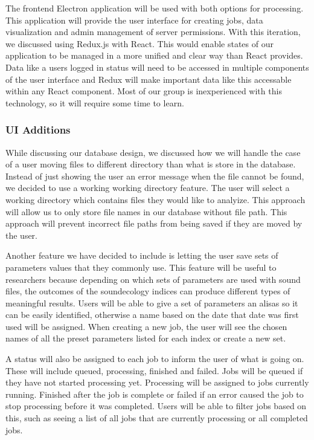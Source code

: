 The frontend Electron application will be used with both options for processing. This application will provide the user interface for creating jobs, data visualization and admin management of server permissions. With this iteration, we discussed using Redux.js with React. This would enable states of our application to be managed in a more unified and clear way than React provides. Data like a user\textquotesingle s logged in status will need to be accessed in multiple components of the user interface and Redux will make important data like this accessable within any React component. Most of our group is inexperienced with this technology, so it will require some time to learn.\par

\subsubsection{UI Additions}
While discussing our database design, we discussed how we will handle the case of a user moving files to different directory than what is store in the database. Instead of just showing the user an error message when  the file cannot be found, we decided to use a working working directory feature. The user will select a working directory which contains files they would like to analyize. This approach will allow us to only store file names in our database without file path. This approach will prevent incorrect file paths from being saved if they are moved by the user.\par
Another feature we have decided to include is letting the user save sets of parameters values that they commonly use. This feature will be useful to researchers because depending on which sets of parameters are used with sound files, the outcomes of the soundecology indices can produce different types of meaningful results. Users will be able to give a set of parameters an alisas so it can be easily identified, otherwise a name based on the date that date was first used will be assigned. When creating a new job, the user will see the chosen names of all the preset parameters listed for each index or create a new set.\par
A status will also be assigned to each job to inform the user of what is going on. These will include queued, processing, finished and failed. Jobs will be queued if they have not started processing yet. Processing will be assigned to jobs currently running. Finished after the job is complete or failed if an error caused the job to stop processing before it was completed. Users will be able to filter jobs based on this, such as seeing a list of all jobs that are currently processing or all completed jobs.\par

